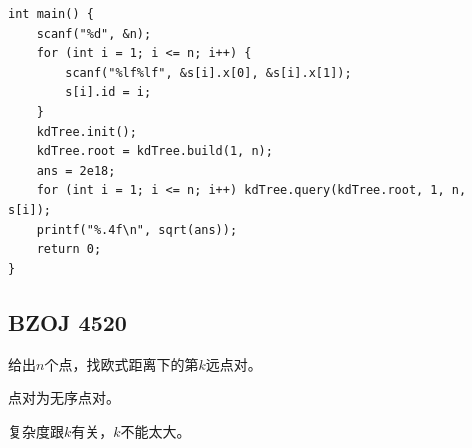 \begin{lstlisting}
int main() {
    scanf("%d", &n);
    for (int i = 1; i <= n; i++) {
		scanf("%lf%lf", &s[i].x[0], &s[i].x[1]); 
		s[i].id = i;	
	}
	kdTree.init();
	kdTree.root = kdTree.build(1, n);
	ans = 2e18;
    for (int i = 1; i <= n; i++) kdTree.query(kdTree.root, 1, n, s[i]); 
    printf("%.4f\n", sqrt(ans));
    return 0;
}
\end{lstlisting}


\subsection{BZOJ 4520}

给出$n$个点，找欧式距离下的第$k$远点对。\par
点对为无序点对。\par
复杂度跟$k$有关，$k$不能太大。\par

